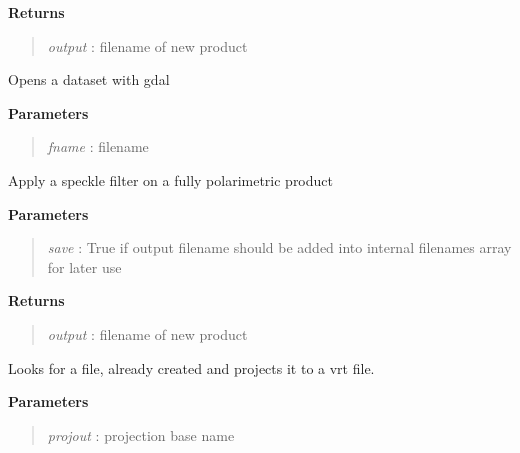 \documentclass[letterpaper,10pt,openany,oneside]{sphinxmanual}
\begin{document}
\begin{fulllineitems}
\begin{fulllineitems}
\textbf{Returns}
\begin{quote}

\emph{output} : filename of new product
\end{quote}

\end{fulllineitems}


\begin{fulllineitems}
\label{code:Image.Image.openDataset}
Opens a dataset with gdal

\textbf{Parameters}
\begin{quote}

\emph{fname} : filename
\end{quote}

\end{fulllineitems}


\begin{fulllineitems}
\label{code:Image.Image.polarFilter}
Apply a speckle filter on a fully polarimetric product

\textbf{Parameters}
\begin{quote}

\emph{save}   : True if output filename should be added into internal filenames array for later use
\end{quote}

\textbf{Returns}
\begin{quote}

\emph{output} : filename of new product
\end{quote}

\end{fulllineitems}


\begin{fulllineitems}
\label{code:Image.Image.projectImg}
Looks for a file, already created and projects it to a vrt file.

\textbf{Parameters}
\begin{quote}

\emph{projout}  : projection base name


\end{quote}
\end{fulllineitems}
\end{fulllineitems}
\end{document}
